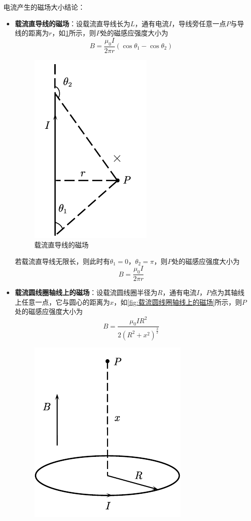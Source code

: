 \documentclass[12pt, a4paper, twoside]{ctexbook}
\begin{document}
{\sonti 电流产生的磁场大小结论}：
\begin{itemize}
    \item \textbf{载流直导线的磁场}：设载流直导线长为$L$，通有电流$I$，导线旁任意一点$P$与导线的距离为$r$，如\textcolor{blue}{\cref{fig:载流直导线的磁场}}所示，则$P$处的磁感应强度大小为
    $$
    B=\frac{\mu_0I}{2\pi r}\left(\cos\theta_1-\cos\theta_2\right)
    $$
    \begin{figure}[H]
        \centerline{\includegraphics[scale=1.0]{载流直导线的磁场.pdf}}
        \caption{载流直导线的磁场}
        \label{fig:载流直导线的磁场}
    \end{figure}
    若载流直导线无限长，则此时有$\theta_1=0$，$\theta_2=\pi$，则$P$处的磁感应强度大小为
    $$
    B=\frac{\mu_0I}{2\pi r}
    $$
    \item \textbf{载流圆线圈轴线上的磁场}：设载流圆线圈半径为$R$，通有电流$I$，$P$点为其轴线上任意一点，它与圆心的距离为$x$，如\textcolor{blue}{\cref{fig:载流圆线圈轴线上的磁场}}所示，则$P$处的磁感应强度大小为
    $$
    B=\frac{\mu_0I R^2}{2\left(R^2+x^2\right)^{\frac{3}{2}}}
    $$
    \begin{figure}[H]
        \centerline{\includegraphics[scale=0.88]{载流圆线圈轴线上的磁场.pdf}}

\end{figure}
\end{itemize}
\end{document}
